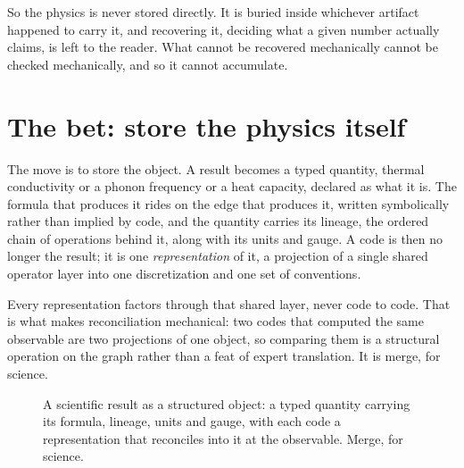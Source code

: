 \documentclass[11pt,a4paper]{article}
\begin{document}
So the physics is never stored directly. It is buried inside whichever artifact
happened to carry it, and recovering it, deciding what a given number actually
claims, is left to the reader. What cannot be recovered mechanically cannot be
checked mechanically, and so it cannot accumulate.

\section{The bet: store the physics itself}

The move is to store the object. A result becomes a typed quantity, thermal
conductivity or a phonon frequency or a heat capacity, declared as what it is. The
formula that produces it rides on the edge that produces it, written symbolically
rather than implied by code, and the quantity carries its lineage, the ordered
chain of operations behind it, along with its units and gauge. A code is then no
longer the result; it is one \emph{representation} of it, a projection of a single
shared operator layer into one discretization and one set of conventions.

Every representation factors through that shared layer, never code to code. That
is what makes reconciliation mechanical: two codes that computed the same
observable are two projections of one object, so comparing them is a structural
operation on the graph rather than a feat of expert translation. It is merge, for
science.

\begin{figure}[h]
\centering
{}
\caption{A scientific result as a structured object: a typed quantity carrying its
formula, lineage, units and gauge, with each code a representation that reconciles
into it at the observable. Merge, for science.}
\end{figure}
\end{document}
